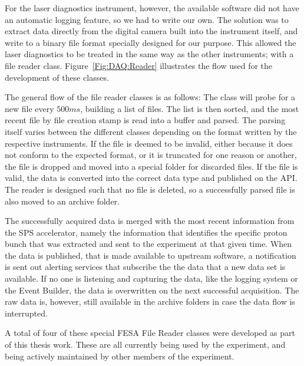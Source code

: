For the laser diagnostics instrument, however, the available software did not have an automatic logging feature, so we had to write our own.
The solution was to extract data directly from the digital camera built into the instrument itself, and write to a binary file format specially designed for our purpose.
This allowed the laser diagnostics to be treated in the same way as the other instruments; with a file reader class.
Figure~\ref{Fig:DAQ:Reader} illustrates the flow used for the development of these classes.

The general flow of the file reader classes is as follows:
The class will probe for a new file every $500\unit{ms}$, building a list of files.
The list is then sorted, and the most recent file by file creation stamp is read into a buffer and parsed.
The parsing itself varies between the different classes depending on the format written by the respective instruments.
If the file is deemed to be invalid, either because it does not conform to the expected format, or it is truncated for one reason or another, the file is dropped and moved into a special folder for discarded files.
If the file is valid, the data is converted into the correct data type and published on the API.
The reader is designed such that no file is deleted, so a successfully parsed file is also moved to an archive folder.

The successfully acquired data is merged with the most recent information from the SPS accelerator, namely the information that identifies the specific proton bunch that was extracted and sent to the experiment at that given time.
When the data is published, that is made available to upstream software, a notification is sent out alerting services that subscribe the the data that a new data set is available.
If no one is listening and capturing the data, like the logging system or the Event Builder, the data is overwritten on the next successful acquisition.
The raw data is, however, still available in the archive folders in case the data flow is interrupted.

A total of four of these special FESA File Reader classes were developed as part of this thesis work.
These are all currently being used by the experiment, and being actively maintained by other members of the experiment.

